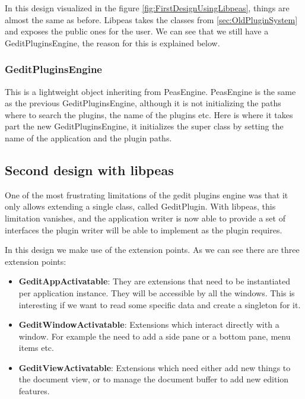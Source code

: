 
In this design visualized in the figure \ref{fig:FirstDesignUsingLibpeas}, things are almost the same as before. Libpeas takes the classes from \ref{sec:OldPluginSystem} and exposes the public ones for the user. We can see that we still have a GeditPluginsEngine, the reason for this is explained below.

\subsubsection{GeditPluginsEngine}

This is a lightweight object inheriting from PeasEngine. PeasEngine is the same as the previous GeditPluginsEngine, although it is not initializing the paths where to search the plugins, the name of the plugins etc. Here is where it takes part the new GeditPluginsEngine, it initializes the super class by setting the name of the application and the plugin paths.

\subsection{Second design with libpeas}


One of the most frustrating limitations of the gedit plugins engine was that it only allows extending a single class, called GeditPlugin. With libpeas, this limitation vanishes, and the application writer is now able to provide a set of interfaces the plugin writer will be able to implement as the plugin requires.

In this design we make use of the extension points. As we can see there are three extension points:
\begin{itemize}
  \item \textbf{GeditAppActivatable}: They are extensions that need to be instantiated per application instance. They will be accessible by all the windows. This is interesting if we want to read some specific data and create a singleton for it.
  \item \textbf{GeditWindowActivatable}: Extensions which interact directly with a window. For example the need to add a side pane or a bottom pane, menu items etc.
  \item \textbf{GeditViewActivatable}: Extensions which need either add new things to the document view, or to manage the document buffer to add new edition features.
\end{itemize}

